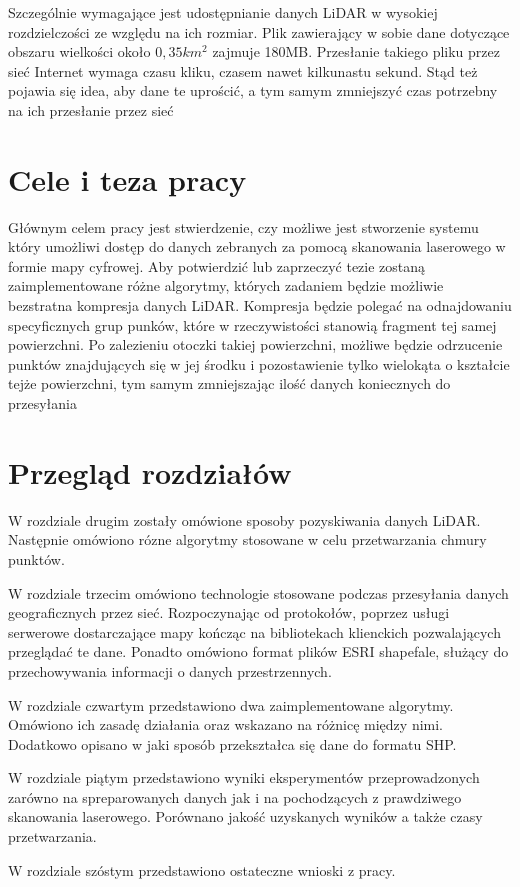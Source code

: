 Szczególnie wymagające jest udostępnianie danych LiDAR w wysokiej rozdzielczości ze względu na ich rozmiar. Plik zawierający
w sobie dane dotyczące obszaru wielkości około $0,35km^2$ zajmuje 180MB. Przesłanie takiego pliku przez sieć Internet wymaga
czasu kliku, czasem nawet kilkunastu sekund. Stąd też pojawia się idea, aby dane te uprościć, a tym samym zmniejszyć czas potrzebny
na ich przesłanie przez sieć

\section{Cele i teza pracy}

Głównym celem pracy jest stwierdzenie, czy możliwe jest stworzenie systemu który umożliwi dostęp do danych zebranych za pomocą
skanowania laserowego w formie mapy cyfrowej. Aby potwierdzić lub zaprzeczyć tezie zostaną zaimplementowane różne algorytmy, których
zadaniem będzie możliwie bezstratna kompresja danych LiDAR. Kompresja będzie polegać na odnajdowaniu specyficznych grup punków, które
w rzeczywistości stanowią fragment tej samej powierzchni. Po zalezieniu otoczki takiej powierzchni, możliwe będzie odrzucenie punktów
znajdujących się w jej środku i pozostawienie tylko wielokąta o kształcie tejże powierzchni, tym samym zmniejszając ilość danych
koniecznych do przesyłania

\section{Przegląd rozdziałów}

W rozdziale drugim zostały omówione sposoby pozyskiwania danych LiDAR.
Następnie omówiono rózne algorytmy stosowane w celu przetwarzania chmury punktów.

W rozdziale trzecim omówiono technologie stosowane podczas przesyłania danych geograficznych przez sieć. Rozpoczynając od protokołów,
poprzez usługi serwerowe dostarczające mapy kończąc na bibliotekach klienckich pozwalających przeglądać te dane. Ponadto omówiono
format plików ESRI shapefale, służący do przechowywania informacji o danych przestrzennych.

W rozdziale czwartym przedstawiono dwa zaimplementowane algorytmy. Omówiono ich zasadę działania oraz wskazano na różnicę między nimi.
Dodatkowo opisano w jaki sposób przekształca się dane do formatu SHP.

W rozdziale piątym przedstawiono wyniki eksperymentów przeprowadzonych zarówno na spreparowanych danych jak i na pochodzących z prawdziwego
skanowania laserowego. Porównano jakość uzyskanych wyników a także czasy przetwarzania.

W rozdziale szóstym przedstawiono ostateczne wnioski z pracy.
